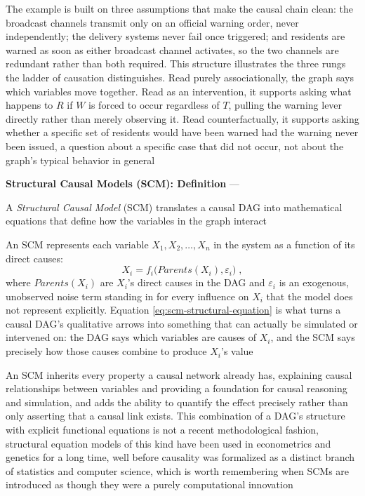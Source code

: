 The example is built on three assumptions that make the causal chain
clean: the broadcast channels transmit only on an official warning order,
never independently; the delivery systems never fail once triggered; and
residents are warned as soon as either broadcast channel activates, so the
two channels are redundant rather than both required. This structure
illustrates the three rungs the ladder of causation distinguishes. Read
purely associationally, the graph says which variables move together.
Read as an intervention, it supports asking what happens to $R$ if $W$ is
forced to occur regardless of $T$, pulling the warning lever directly
rather than merely observing it. Read counterfactually, it supports asking
whether a specific set of residents would have been warned had the warning
never been issued, a question about a specific case that did not occur,
not about the graph's typical behavior in general

\textbf{Structural Causal Models (SCM): Definition} --- \begin{definition}
  A \emph{Structural Causal Model} (SCM) translates a causal DAG into
  mathematical equations that define how the variables in the graph
  interact
\end{definition}
An SCM represents each variable $X_1, X_2, \ldots, X_n$ in the system as a
function of its direct causes:
\begin{equation}
  \label{eq:scm-structural-equation}
  X_i = f_i\bigl(Parents(X_i), \varepsilon_i\bigr)\;,
\end{equation}
where $Parents(X_i)$ are $X_i$'s direct causes in the DAG and $\varepsilon_i$
is an exogenous, unobserved noise term standing in for every influence on
$X_i$ that the model does not represent explicitly. Equation
\eqref{eq:scm-structural-equation} is what turns a causal DAG's qualitative
arrows into something that can actually be simulated or intervened on: the
DAG says which variables are causes of $X_i$, and the SCM says precisely
how those causes combine to produce $X_i$'s value

An SCM inherits every property a causal network already has, explaining
causal relationships between variables and providing a foundation for
causal reasoning and simulation, and adds the ability to quantify the
effect precisely rather than only asserting that a causal link exists.
This combination of a DAG's structure with explicit functional equations
is not a recent methodological fashion, structural equation models of this
kind have been used in econometrics and genetics for a long time, well
before causality was formalized as a distinct branch of statistics and
computer science, which is worth remembering when SCMs are introduced as
though they were a purely computational innovation

